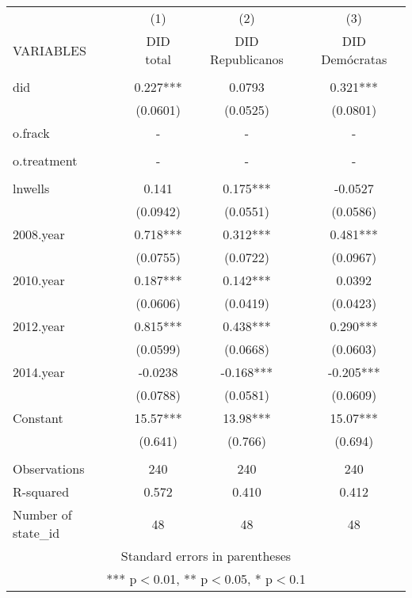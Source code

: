 \begin{tabular}{lccc} \hline
 & (1) & (2) & (3) \\
VARIABLES & DID total & DID Republicanos & DID Demócratas \\ \hline
 &  &  &  \\
did & 0.227*** & 0.0793 & 0.321*** \\
 & (0.0601) & (0.0525) & (0.0801) \\
o.frack & - & - & - \\
 &  &  &  \\
o.treatment & - & - & - \\
 &  &  &  \\
lnwells & 0.141 & 0.175*** & -0.0527 \\
 & (0.0942) & (0.0551) & (0.0586) \\
2008.year & 0.718*** & 0.312*** & 0.481*** \\
 & (0.0755) & (0.0722) & (0.0967) \\
2010.year & 0.187*** & 0.142*** & 0.0392 \\
 & (0.0606) & (0.0419) & (0.0423) \\
2012.year & 0.815*** & 0.438*** & 0.290*** \\
 & (0.0599) & (0.0668) & (0.0603) \\
2014.year & -0.0238 & -0.168*** & -0.205*** \\
 & (0.0788) & (0.0581) & (0.0609) \\
Constant & 15.57*** & 13.98*** & 15.07*** \\
 & (0.641) & (0.766) & (0.694) \\
 &  &  &  \\
Observations & 240 & 240 & 240 \\
R-squared & 0.572 & 0.410 & 0.412 \\
 Number of state\_id & 48 & 48 & 48 \\ \hline
\multicolumn{4}{c}{ Standard errors in parentheses} \\
\multicolumn{4}{c}{ *** p$<$0.01, ** p$<$0.05, * p$<$0.1} \\
\end{tabular}

